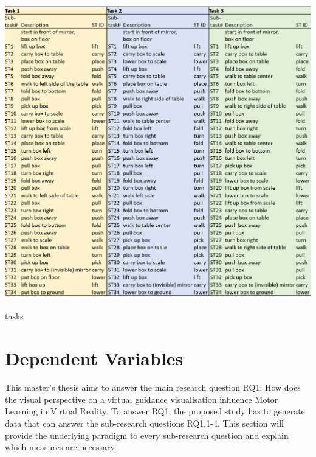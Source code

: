 \begin{table}[H]
	\centering
	\includegraphics[width=\textwidth]{figures/tasks.png}
	\caption[Description of tasks]{tasks}
	\label{tab:tasks}
\end{table}

\section{Dependent Variables}
\label{sec:measures}
This master's thesis aims to answer the main research question RQ1: How does the visual perspective on a virtual guidance visualisation influence Motor Learning in Virtual Reality. To answer RQ1, the proposed study has to generate data that can answer the sub-research questions RQ1.1-4. This section will provide the underlying paradigm to every sub-research question and explain which measures are necessary.\\

